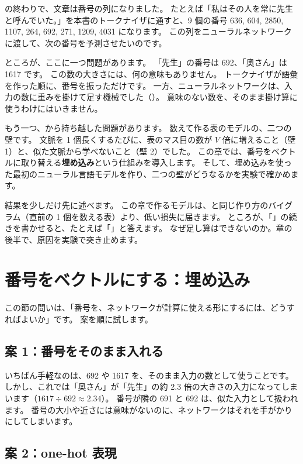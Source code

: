 の終わりで、文章は番号の列になりました。
たとえば「私はその人を常に先生と呼んでいた。」を本書のトークナイザに通すと、9 個の番号 636, 604, 2850, 1107, 264, 692, 271, 1209, 4031 になります。
この列をニューラルネットワークに渡して、次の番号を予測させたいのです。

ところが、ここに一つ問題があります。
「先生」の番号は 692、「奥さん」は 1617 です。
この数の大きさには、何の意味もありません。
トークナイザが語彙を作った順に、番号を振っただけです。
一方、ニューラルネットワークは、入力の数に重みを掛けて足す機械でした（）。
意味のない数を、そのまま掛け算に使うわけにはいきません。

もう一つ、から持ち越した問題があります。
数えて作る表のモデルの、二つの壁です。
文脈を 1 個長くするたびに、表のマス目の数が $V$ 倍に増えること（壁 1）と、似た文脈から学べないこと（壁 2）でした。
この章では、番号をベクトルに取り替える\textbf{埋め込み}という仕組みを導入します。
そして、埋め込みを使った最初のニューラル言語モデルを作り、二つの壁がどうなるかを実験で確かめます。

結果を少しだけ先に述べます。
この章で作るモデルは、と同じ作り方のバイグラム（直前の 1 個を数える表）より、低い損失に届きます。
ところが、「」の続きを書かせると、たとえば「」と答えます。
なぜ足し算はできないのか。章の後半で、原因を実験で突き止めます。

\section{番号をベクトルにする：埋め込み}\label{sec:emb-lookup}

この節の問いは、「番号を、ネットワークが計算に使える形にするには、どうすればよいか」です。
案を順に試します。

\subsection*{案 1：番号をそのまま入れる}

いちばん手軽なのは、692 や 1617 を、そのまま入力の数として使うことです。
しかし、これでは「奥さん」が「先生」の約 2.3 倍の大きさの入力になってしまいます（$1617\div692\approx2.34$）。
番号が隣の 691 と 692 は、似た入力として扱われます。
番号の大小や近さには意味がないのに、ネットワークはそれを手がかりにしてしまいます。

\subsection*{案 2：one-hot 表現}


